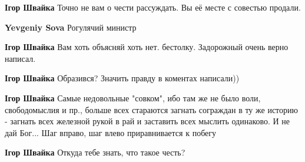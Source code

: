 \begin{itemize}
\begin{itemize}
\textbf{Ігор Швайка} Точно не вам о чести рассуждать. Вы её месте с совестью продали.

 
\textbf{Yevgeniy Sova} Рогулячий министр🤣

 
\textbf{Ігор Швайка} Вам хоть объясняй хоть нет. бестолку. Задорожный очень верно написал.

 
\textbf{Ігор Швайка} Образився? Значить правду в коментах написали))

 
\textbf{Ігор Швайка} Самые недовольные "совком", ибо там же не было воли,
свободомыслия и пр., больше всех стараются загнать сограждан в ту же историю -
загнать всех железной рукой в рай и заставить всех мыслить одинаково. И не дай
Бог... Шаг вправо, шаг влево приравнивается к побегу

 
\textbf{Ігор Швайка} Откуда тебе знать, что такое честь?

 

\end{itemize}
\end{itemize}

